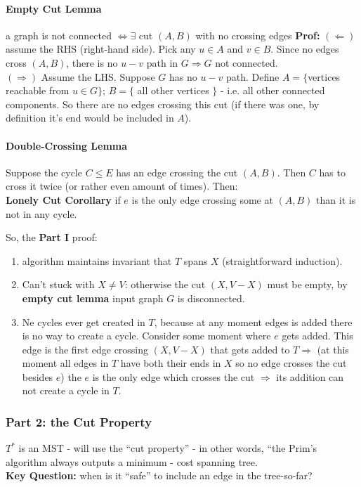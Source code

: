 \documentclass{scrartcl}
\begin{document}
\paragraph{Empty Cut Lemma} a graph is not connected $\Leftrightarrow \exists$
cut $(A, B)$ with no crossing edges {\bf Prof: } $(\Leftarrow)$ assume the RHS
(right-hand side). Pick any $u \in A$ and $v \in B$. Since no edges cross $(A,
B)$, there is no $u-v$ path in $G
\Rightarrow G$ not connected. \\
$(\Rightarrow)$ Assume the LHS. Suppose $G$ has no $u-v$ path. Define $A =
\{$vertices reachable from $u \in G\}$; $B = \{$ all other vertices $\}$ - i.e.
all other connected components. So there are no edges crossing this cut (if
there was one, by definition it's end would be included in $A$).

\paragraph{Double-Crossing Lemma} Suppose the cycle $C \leq E$ has an edge
crossing the cut $(A,B)$. Then $C$ has to cross it twice (or rather even amount
of times). Then: \\
{\bf Lonely Cut Corollary} if $e$ is the only edge crossing some at $(A, B)$
than it is not in any cycle.

So, the {\bf Part I} proof:\\
\begin{enumerate}
\item algorithm maintains invariant that $T$ spans $X$ (straightforward
  induction).
\item Can't stuck with $X \neq V$: otherwise the cut $(X, V - X)$ must be empty,
  by {\bf empty cut lemma} input graph $G$ is disconnected.
\item Ne cycles ever get created in $T$, because at any moment edges is added
  there is no way to create a cycle. Consider some moment where $e$ gets added.
  This edge is the first edge crossing $(X, V-X)$ that gets added to $T
  \Rightarrow$ (at this moment all edges in $T$ have both their ends in $X$ so
  no edge crosses the cut besides $e$) the $e$ is the only edge which crosses
  the cut $\Rightarrow$ its addition can not create a cycle in $T$.
\end{enumerate}
\subsubsection*{Part 2: the Cut Property } $T^*$ is an MST - will use the ``cut
property'' - in other words, ``the Prim's algorithm always outputs a minimum -
cost spanning tree.\\
{\bf Key Question: } when is it ``safe'' to include an edge in the tree-so-far?
\end{document}
